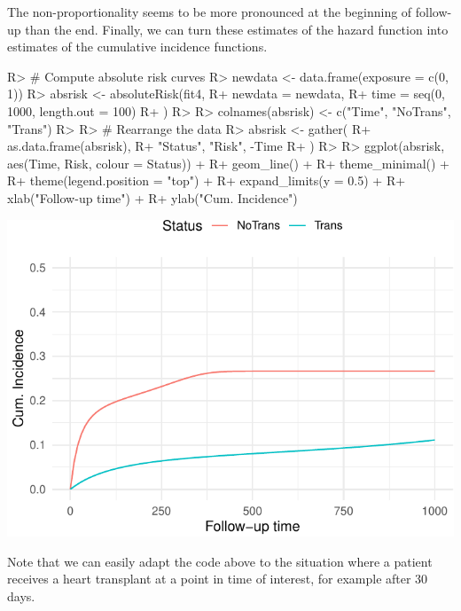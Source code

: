 \documentclass[
]{jss}
\begin{document}
The non-proportionality seems to be more pronounced at the beginning of
follow-up than the end. Finally, we can turn these estimates of the
hazard function into estimates of the cumulative incidence functions.

\begin{CodeChunk}

\begin{CodeInput}
R> # Compute absolute risk curves
R> newdata <- data.frame(exposure = c(0, 1))
R> absrisk <- absoluteRisk(fit4,
R+   newdata = newdata,
R+   time = seq(0, 1000, length.out = 100)
R+ )
R> 
R> colnames(absrisk) <- c("Time", "NoTrans", "Trans")
R> 
R> # Rearrange the data
R> absrisk <- gather(
R+   as.data.frame(absrisk),
R+   "Status", "Risk", -Time
R+ )
R> 
R> ggplot(absrisk, aes(Time, Risk, colour = Status)) +
R+   geom_line() +
R+   theme_minimal() +
R+   theme(legend.position = "top") +
R+   expand_limits(y = 0.5) +
R+   xlab("Follow-up time") +
R+   ylab("Cum. Incidence")
\end{CodeInput}


\begin{center}\includegraphics{../figures/stanford-risk-1} \end{center}

\end{CodeChunk}

Note that we can easily adapt the code above to the situation where a
patient receives a heart transplant at a point in time of interest, for
example after 30 days.
\end{document}
